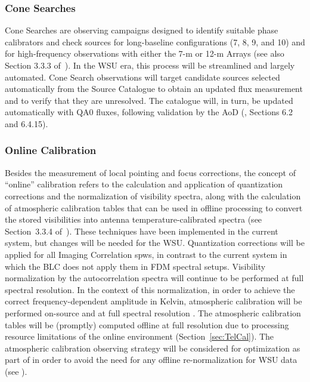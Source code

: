 \subsubsection{Cone Searches}
\label{subsec:cone}
Cone Searches are observing campaigns designed to identify suitable phase calibrators and check sources for long-baseline configurations (7, 8, 9, and 10) and for high-frequency observations with either the 7-m or 12-m Arrays (see also Section 3.3.3 of~\cite{CSA-IA}). In the WSU era, this process will be streamlined and largely automated. Cone Search observations will target candidate sources selected automatically from the Source Catalogue to obtain an updated  flux measurement and to verify that they are unresolved. The catalogue will, in turn, be updated automatically with QA0 fluxes, following validation by the \ac{AoD} (\cite{acsos}, Sections 6.2 and 6.4.15).



\subsubsection{Online Calibration}
Besides the measurement of local pointing and focus corrections, the concept of ``online'' calibration refers to the calculation and application of quantization corrections and the normalization of visibility spectra, along with the calculation of atmospheric calibration tables that can be used in offline processing to convert the stored visibilities into antenna temperature-calibrated spectra (see Section~3.3.4 of~\cite{CSA-IA}). These techniques have been implemented in the current system, but changes will be needed for the WSU.
Quantization corrections will
be applied for all Imaging Correlation  \acp{spw}, in contrast to the current system in which the \ac{BLC} does not apply them in \ac{FDM} spectral setups.  Visibility normalization by the autocorrelation spectra will continue to be performed at full spectral resolution. In the context of this normalization, in order to achieve the correct frequency-dependent amplitude in Kelvin, atmospheric calibration will be performed on-source and at full spectral resolution \cite{normalizationAndTsys}. The atmospheric calibration tables will be (promptly) computed offline at full resolution due to processing resource limitations of the online environment (Section~\ref{sec:TelCal}).
The atmospheric calibration observing strategy will be considered for optimization as part of \cite{TWO} in order to avoid the need for any offline re-normalization for WSU data (see \cite{normalizationAndTsys}).


